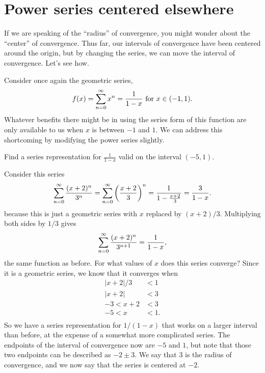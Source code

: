 \section{Power series centered elsewhere}
\label{section:power-series-centered-around-a}

If we are speaking of the ``radius'' of convergence, you might wonder
about the ``center'' of convergence.  Thus far, our intervals of
convergence have been centered around the origin, but by changing the
series, we can move the interval of convergence.  Let's see how.

Consider once again the geometric series,
$$
f(x) = \sum_{n=0}^\infty x^n={1\over 1-x} \mbox{ for $x \in (-1,1)$.}
$$
Whatever benefits there might be in using the series form of this
function are only available to us when $x$ is between $-1$ and
$1$.  We can address this shortcoming by modifying the power
series slightly.

\begin{example}
\label{example:one-over-one-minus-x-on-different-interval}
Find a series representation for $\frac{1}{1-x}$ valid on the interval $(-5,1)$.
\end{example}

\begin{solution}
Consider this series
$$
  \sum_{n=0}^\infty {(x+2)^n\over 3^n}=
  \sum_{n=0}^\infty \left({x+2\over 3}\right)^n={1\over 1-{x+2\over 3}}=
  {3\over 1-x}.
$$
because this is just a geometric series with $x$ replaced by
$(x+2)/3$. Multiplying both sides by $1/3$
gives %
$$\sum_{n=0}^\infty {(x+2)^n\over 3^{n+1}}={1\over 1-x},$$
the same function as before. For what values of $x$ does this series
converge? Since it is a geometric series, we know that it converges
when 
\begin{align*}
  |x+2|/3&<1 \\
  |x+2|&<3 \\
  -3 < x+2 &< 3 \\
  -5<x&<1. \\
\end{align*}
So we have a series representation for $1/(1-x)$ that works on a
larger interval than before, at the expense of a somewhat more
complicated series. The endpoints of the interval of convergence now
are $-5$ and $1$, but note that those two endpoints can be described
as $-2\pm3$. We say that $3$ is the radius of convergence, and we now
say that the series is centered at $-2$.
\end{solution}

